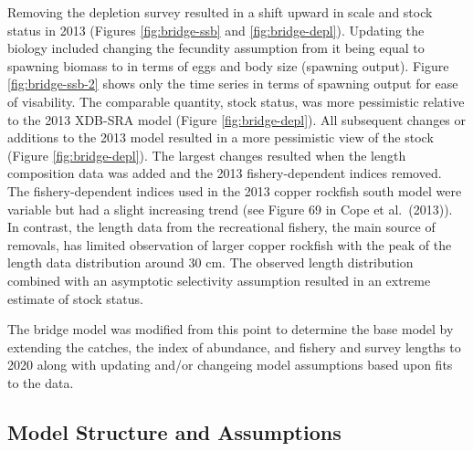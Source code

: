 \documentclass[11pt,
  english,
  a4paper,
]{article}
\begin{document}
Removing the depletion survey resulted in a shift upward in scale and stock status in 2013 (Figures \ref{fig:bridge-ssb} and \ref{fig:bridge-depl}). Updating the biology included changing the fecundity assumption from it being equal to spawning biomass to in terms of eggs and body size (spawning output). Figure \ref{fig:bridge-ssb-2} shows only the time series in terms of spawning output for ease of visability. The comparable quantity, stock status, was more pessimistic relative to the 2013 XDB-SRA model (Figure \ref{fig:bridge-depl}). All subsequent changes or additions to the 2013 model resulted in a more pessimistic view of the stock (Figure \ref{fig:bridge-depl}). The largest changes resulted when the length composition data was added and the 2013 fishery-dependent indices removed. The fishery-dependent indices used in the 2013 copper rockfish south model were variable but had a slight increasing trend (see Figure 69 in Cope et al.~{(2013)\leavevmode\tagmcend\tagstructend}). In contrast, the length data from the recreational fishery, the main source of removals, has limited observation of larger copper rockfish with the peak of the length data distribution around 30 cm. The observed length distribution combined with an asymptotic selectivity assumption resulted in an extreme estimate of stock status.

\leavevmode\tagmcend\tagstructend\par


The bridge model was modified from this point to determine the base model by extending the catches, the index of abundance, and fishery and survey lengths to 2020 along with updating and/or changeing model assumptions based upon fits to the data.

\leavevmode\tagmcend\tagstructend\par


\hypertarget{model-structure-and-assumptions}{%
\subsection{Model Structure and Assumptions}\label{model-structure-and-assumptions}}

\leavevmode\tagmcend\tagstructend

\end{document}
